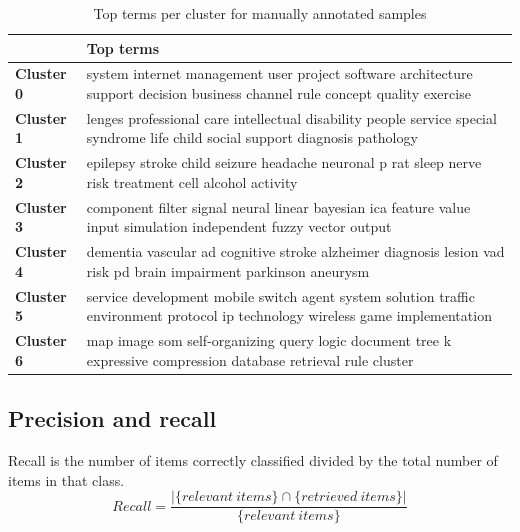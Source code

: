 \begin{table}
\begin{tabular}{|p{2cm}|p{10.5cm}|} 
\hline %
\textbf{ } & \textbf{Top terms} \\ 
\hline 
\textbf{Cluster 0} & system internet management user project software architecture support decision business channel rule concept quality exercise  \\ 
\hline
\hline 
\textbf{Cluster 1} & lenges professional care intellectual disability people service special syndrome life child social support diagnosis pathology  \\ 
\hline
\hline 
\textbf{Cluster 2} & epilepsy stroke child seizure headache neuronal p rat sleep nerve risk treatment cell alcohol activity  \\ 
\hline
\hline 
\textbf{Cluster 3} & component filter signal neural linear bayesian ica feature value input simulation independent fuzzy vector output \\ 
\hline
\hline 
\textbf{Cluster 4} & dementia vascular ad cognitive stroke alzheimer diagnosis lesion vad risk pd brain impairment parkinson aneurysm \\ 
\hline
\hline 
\textbf{Cluster 5} & service development mobile switch agent system solution traffic environment protocol ip technology wireless game implementation \\ 
\hline
\hline 
\textbf{Cluster 6} & map image som self-organizing query logic document tree k expressive compression database retrieval rule cluster \\ 
\hline
\end{tabular} %
\caption{Top terms per cluster for manually annotated samples}
\label{table:topterms}
\end{table} %


\subsection{Precision and recall}
Recall is the number of items correctly classified divided by the 
total number of items in that class.
\begin{equation}
 Recall = \frac{|\{relevant\ items\} \cap \{retrieved\ items\}|} 
{\{relevant\ items\}}
\end{equation}

